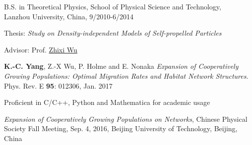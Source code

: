 \documentclass[11pt,article,oneside]{memoir}
\begin{document}
\ind B.S. in Theoretical Physics, School of Physical Science and Technology, \\ Lanzhou University, China, 9/2010-6/2014

\ind \hspace{0.35in} \footnotesize Thesis: \emph{Study on Density-independent Models of Self-propelled Particles} \normalsize \vspace{0.01in}

\ind \hspace{0.35in} \footnotesize Advisor: Prof. \href{http://phy.lzu.edu.cn/lzupage/2013/04/08/N20130408100301.html}{Zhixi Wu} \normalsize \vspace{0.01in}

\bigskip
 

\medskip

\ind \textbf{K.-C. Yang}, Z.-X Wu, P. Holme and E. Nonaka \emph{Expansion of Cooperatively Growing Populations: Optimal Migration Rates and Habitat Network Structures}. Phys. Rev. E \textbf{95}: 012306, Jan. 2017

\bigskip


\medskip

\ind Proficient in C/C++, Python and Mathematica for academic usage

\bigskip
\bigskip

\bigskip


\medskip

\ind \emph{Expansion of Cooperatively Growing Populations on Networks}, Chinese Physical Society Fall Meeting, Sep. 4, 2016, Beijing University of Technology, Beijing, China

\bigskip
\end{document}
